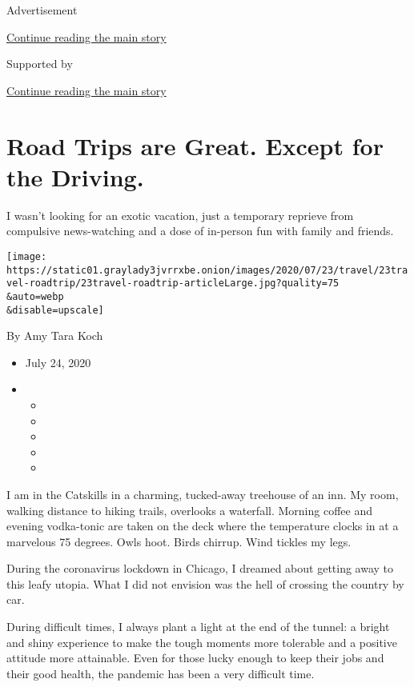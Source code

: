 Advertisement

\protect\hyperlink{after-top}{Continue reading the main story}

Supported by

\protect\hyperlink{after-sponsor}{Continue reading the main story}

\hypertarget{road-trips-are-great-except-for-the-driving}{%
\section{Road Trips are Great. Except for the
Driving.}\label{road-trips-are-great-except-for-the-driving}}

I wasn't looking for an exotic vacation, just a temporary reprieve from
compulsive news-watching and a dose of in-person fun with family and
friends.

\texttt{[image: https://static01.graylady3jvrrxbe.onion/images/2020/07/23/travel/23travel-roadtrip/23travel-roadtrip-articleLarge.jpg?quality=75\\\&auto=webp\\\&disable=upscale]}

By Amy Tara Koch

\begin{itemize}
\item
  July 24, 2020
\item
  \begin{itemize}
  \item
  \item
  \item
  \item
  \item
  \end{itemize}
\end{itemize}

I am in the Catskills in a charming, tucked-away treehouse of an inn. My
room, walking distance to hiking trails, overlooks a waterfall. Morning
coffee and evening vodka-tonic are taken on the deck where the
temperature clocks in at a marvelous 75 degrees. Owls hoot. Birds
chirrup. Wind tickles my legs.

During the coronavirus lockdown in Chicago, I dreamed about getting away
to this leafy utopia. What I did not envision was the hell of crossing
the country by car.

During difficult times, I always plant a light at the end of the tunnel:
a bright and shiny experience to make the tough moments more tolerable
and a positive attitude more attainable. Even for those lucky enough to
keep their jobs and their good health, the pandemic has been a very
difficult time.


